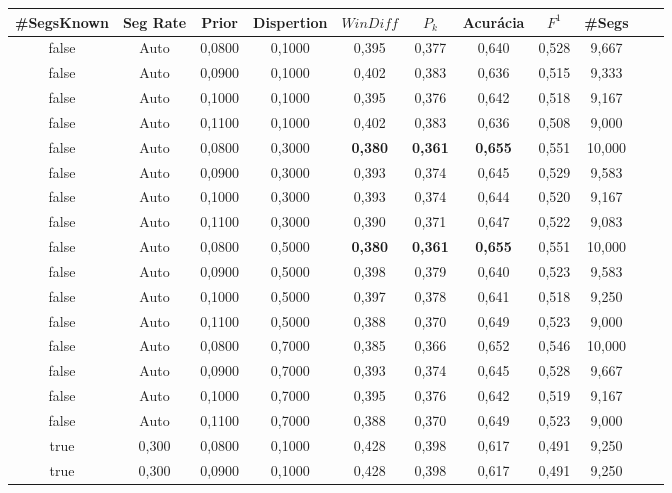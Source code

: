 \documentclass{article}
\begin{document}
\begin{longtable}[c]{|c|c|c|c|c|c|c|c|c|c|c|} 
\hline 
 \#SegsKnown & Seg Rate & Prior & Dispertion & $WinDiff$ & $P_k$ & Acurácia & $F^1$ & \#Segs\\ \hline 
 false & Auto & 0,0800 & 0,1000 & 0,395 & 0,377 & 0,640 & 0,528 & 9,667  \\ \hline 
 false & Auto & 0,0900 & 0,1000 & 0,402 & 0,383 & 0,636 & 0,515 & 9,333  \\ \hline 
 false & Auto & 0,1000 & 0,1000 & 0,395 & 0,376 & 0,642 & 0,518 & 9,167  \\ \hline 
 false & Auto & 0,1100 & 0,1000 & 0,402 & 0,383 & 0,636 & 0,508 & 9,000  \\ \hline 
 false & Auto & 0,0800 & 0,3000 & \cellcolor{gray!20} \textbf{0,380} & \cellcolor{gray!20} \textbf{0,361} & \cellcolor{gray!20} \textbf{0,655} & 0,551 & 10,000  \\ \hline 
 false & Auto & 0,0900 & 0,3000 & 0,393 & 0,374 & 0,645 & 0,529 & 9,583  \\ \hline 
 false & Auto & 0,1000 & 0,3000 & 0,393 & 0,374 & 0,644 & 0,520 & 9,167  \\ \hline 
 false & Auto & 0,1100 & 0,3000 & 0,390 & 0,371 & 0,647 & 0,522 & 9,083  \\ \hline 
 false & Auto & 0,0800 & 0,5000 & \cellcolor{gray!20} \textbf{0,380} & \cellcolor{gray!20} \textbf{0,361} & \cellcolor{gray!20} \textbf{0,655} & 0,551 & 10,000  \\ \hline 
 false & Auto & 0,0900 & 0,5000 & 0,398 & 0,379 & 0,640 & 0,523 & 9,583  \\ \hline 
 false & Auto & 0,1000 & 0,5000 & 0,397 & 0,378 & 0,641 & 0,518 & 9,250  \\ \hline 
 false & Auto & 0,1100 & 0,5000 & 0,388 & 0,370 & 0,649 & 0,523 & 9,000  \\ \hline 
 false & Auto & 0,0800 & 0,7000 & 0,385 & 0,366 & 0,652 & 0,546 & 10,000  \\ \hline 
 false & Auto & 0,0900 & 0,7000 & 0,393 & 0,374 & 0,645 & 0,528 & 9,667  \\ \hline 
 false & Auto & 0,1000 & 0,7000 & 0,395 & 0,376 & 0,642 & 0,519 & 9,167  \\ \hline 
 false & Auto & 0,1100 & 0,7000 & 0,388 & 0,370 & 0,649 & 0,523 & 9,000  \\ \hline 
 true & 0,300 & 0,0800 & 0,1000 & 0,428 & 0,398 & 0,617 & 0,491 & 9,250  \\ \hline 
 true & 0,300 & 0,0900 & 0,1000 & 0,428 & 0,398 & 0,617 & 0,491 & 9,250  \\ \hline 

\end{longtable}
\end{document}
